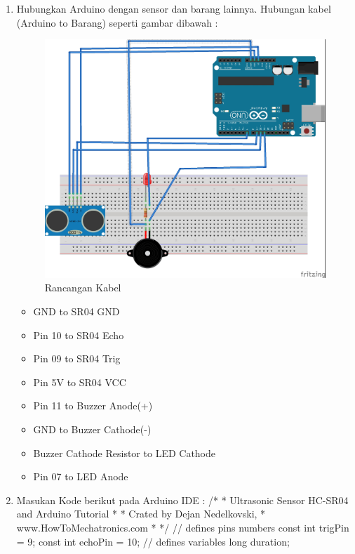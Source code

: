 \begin{enumerate}
	\item Hubungkan Arduino dengan sensor dan barang lainnya. Hubungan kabel (Arduino to Barang) seperti gambar dibawah : 
\begin{figure}[ht]
\centerline{\includegraphics[width=1\textwidth]{figures/rancangan.jpg}}
\caption{Rancangan Kabel}
\label{rancangankabel}
\end{figure}
		\begin{itemize}
			\item GND to SR04 GND
			\item Pin 10 to SR04 Echo
			\item Pin 09 to SR04 Trig
			\item Pin 5V to SR04 VCC
			\item Pin 11 to Buzzer Anode(+)
			\item GND to Buzzer Cathode(-)
			\item Buzzer Cathode Resistor to LED Cathode
			\item Pin 07 to LED Anode
		\end{itemize}
	\item Masukan Kode berikut pada Arduino IDE : 
\begingroup\makeatletter\def\@currenvir{verbatim}
\verbatim
    /*
    * Ultrasonic Sensor HC-SR04 and Arduino Tutorial
    *
    * Crated by Dejan Nedelkovski,
    * www.HowToMechatronics.com
    *
    */
    // defines pins numbers
    const int trigPin = 9;
    const int echoPin = 10;
    // defines variables
    long duration;

\end{enumerate}
